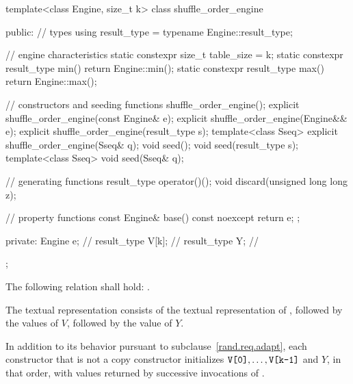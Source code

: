 %
%
\begin{codeblock}
template<class Engine, size_t k>
  class shuffle_order_engine {
  public:
    // types
    using result_type = typename Engine::result_type;

    // engine characteristics
    static constexpr size_t table_size = k;
    static constexpr result_type min() { return Engine::min(); }
    static constexpr result_type max() { return Engine::max(); }

    // constructors and seeding functions
    shuffle_order_engine();
    explicit shuffle_order_engine(const Engine& e);
    explicit shuffle_order_engine(Engine&& e);
    explicit shuffle_order_engine(result_type s);
    template<class Sseq> explicit shuffle_order_engine(Sseq& q);
    void seed();
    void seed(result_type s);
    template<class Sseq> void seed(Sseq& q);

    // generating functions
    result_type operator()();
    void discard(unsigned long long z);

    // property functions
    const Engine& base() const noexcept { return e; };

  private:
    Engine e;           // \expos
    result_type V[k];   // \expos
    result_type Y;      // \expos
  };
\end{codeblock}

\pnum
The following relation shall hold:
  .

\pnum
The textual representation%
%
consists of
 the textual representation of ,
followed by
 the  values of $V$,
followed by
 the value of $Y$.

\pnum
In addition to its behavior
pursuant to subclause~\ref{rand.req.adapt},
each constructor%
that is not a copy constructor
initializes $\texttt{V[0]}, \dotsc, \texttt{V[k-1]}$ and $Y$,
in that order,
with values returned by successive invocations of .%




